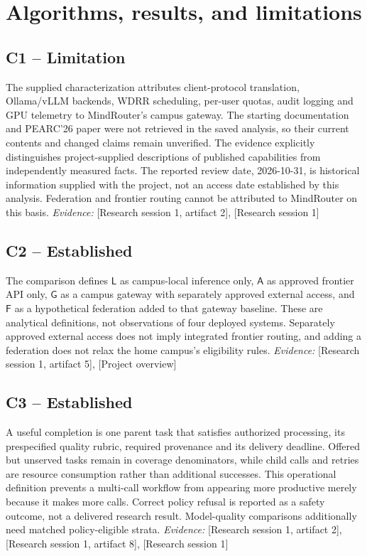 \documentclass[11pt]{article}
\begin{document}
\section{Algorithms, results, and limitations}
\subsection{C1 -- Limitation}
The supplied characterization attributes client-protocol translation, Ollama/vLLM backends, WDRR scheduling, per-user quotas, audit logging and GPU telemetry to MindRouter's campus gateway. The starting documentation and PEARC'26 paper were not retrieved in the saved analysis, so their current contents and changed claims remain unverified.
The evidence explicitly distinguishes project-supplied descriptions of published capabilities from independently measured facts. The reported review date, 2026-10-31, is historical information supplied with the project, not an access date established by this analysis. Federation and frontier routing cannot be attributed to MindRouter on this basis.
\textit{Evidence: }[Research session 1, artifact 2], [Research session 1]
\subsection{C2 -- Established}
The comparison defines $\mathsf{L}$ as campus-local inference only, $\mathsf{A}$ as approved frontier API only, $\mathsf{G}$ as a campus gateway with separately approved external access, and $\mathsf{F}$ as a hypothetical federation added to that gateway baseline.
These are analytical definitions, not observations of four deployed systems. Separately approved external access does not imply integrated frontier routing, and adding a federation does not relax the home campus's eligibility rules.
\textit{Evidence: }[Research session 1, artifact 5], [Project overview]
\subsection{C3 -- Established}
A useful completion is one parent task that satisfies authorized processing, its prespecified quality rubric, required provenance and its delivery deadline. Offered but unserved tasks remain in coverage denominators, while child calls and retries are resource consumption rather than additional successes.
This operational definition prevents a multi-call workflow from appearing more productive merely because it makes more calls. Correct policy refusal is reported as a safety outcome, not a delivered research result. Model-quality comparisons additionally need matched policy-eligible strata.
\textit{Evidence: }[Research session 1, artifact 2], [Research session 1, artifact 8], [Research session 1]
\end{document}
